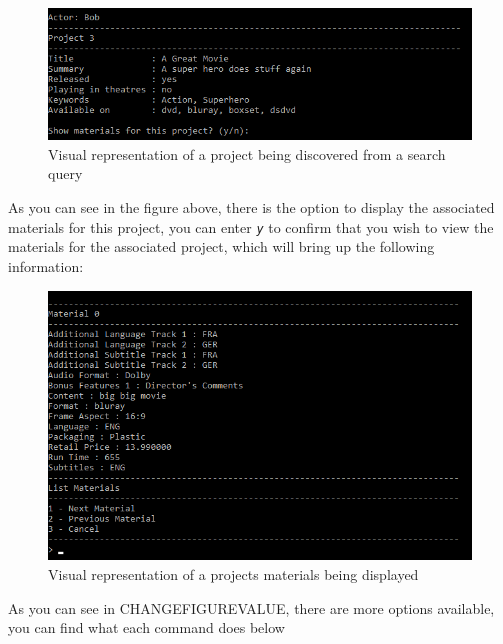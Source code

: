 \documentclass[
  english,
  a4paper,
,tablecaptionabove
]{scrartcl}
\begin{document}
\begin{figure}
\centering
\includegraphics{images/user-guide/view-mode/project-search-actor.png}
\caption{Visual representation of a project being discovered from a
search query}
\end{figure}

As you can see in the figure above, there is the option to display the
associated materials for this project, you can enter \emph{\texttt{y}}
to confirm that you wish to view the materials for the associated
project, which will bring up the following information:

\begin{figure}
\centering
\includegraphics{images/user-guide/view-mode/project-search-list-material.png}
\caption{Visual representation of a projects materials being displayed}
\end{figure}

As you can see in CHANGEFIGUREVALUE, there are more options available,
you can find what each command does below
\end{document}
